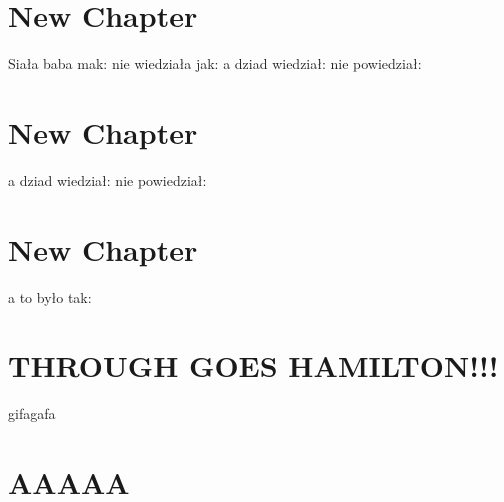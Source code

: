 \documentclass{article}
\begin{document}
\section{New Chapter}
Siała baba mak: nie wiedziała jak: a dziad wiedział: nie powiedział: 
\section{New Chapter}
a dziad wiedział: nie powiedział: 
\section{New Chapter}
a to było tak: 



\section{THROUGH GOES HAMILTON!!!}
gifagafa
\section{AAAAA}
\end{document}
